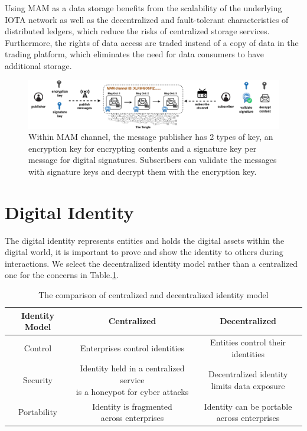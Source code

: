 \begin{spacing}{2.0}
Using MAM as a data storage benefits from the scalability of the underlying IOTA network as well as the decentralized and fault-tolerant characteristics of distributed ledgers, which reduce the risks of centralized storage services. Furthermore, the rights of data access are traded instead of a copy of data in the trading platform, which eliminates the need for data consumers to have additional storage.

\begin{figure}
    \centering
    \includegraphics[width=6.5in]{img/channel_and_key}
    \caption{Within MAM channel, the message publisher has 2 types of key, an encryption key for encrypting contents and a signature key per message for digital signatures. Subscribers can validate the messages with signature keys and decrypt them with the encryption key.}
    \label{fig:channel_and_key}
\end{figure}
\clearpage

\section{Digital Identity}
The digital identity represents entities and holds the digital assets within the digital world, it is important to prove and show the identity to others during interactions. We select the decentralized identity model rather than a centralized one for the concerns in Table.\ref{tab:did}.

\begin{table}[h]
	\caption{The comparison of centralized and decentralized identity model}
	\label{tab:did}
	\begin{tabular}{|c|c|c|}
	\hline
		\textbf{Identity Model} & \textbf{Centralized} & \textbf{Decentralized} \\
		\hline
		Control & Enterprises control identities & Entities control their identities \\
		\hline
		Security & \makecell{Identity held in a centralized service \\ is a  honeypot for cyber attacks} & \makecell{Decentralized identity \\ limits data exposure} \\
		\hline
		Portability & \makecell{Identity is fragmented \\ across enterprises} & \makecell{Identity can be portable \\ across enterprises} \\
		\hline
	\end{tabular}
\end{table}


\end{spacing}
